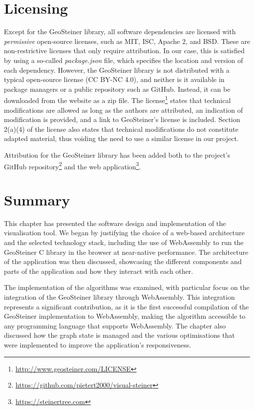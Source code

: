 \documentclass{l4proj}
\begin{document}
\section{Licensing}
Except for the GeoSteiner library, all software dependencies are licensed with \textit{permissive} open-source licenses, such as MIT, ISC, Apache 2, and BSD. These are non-restrictive licenses that only require attribution. In our case, this is satisfied by using a so-called \textit{package.json} file, which specifies the location and version of each dependency.
However, the GeoSteiner library is not distributed with a typical open-source license (CC BY-NC 4.0), and neither is it available in package managers or a public repository such as GitHub. Instead, it can be downloaded from the website as a zip file.
The license\footnote{\url{http://www.geosteiner.com/LICENSE}} states that technical modifications are allowed as long as the authors are attributed, an indication of modification is provided, and a link to GeoSteiner's license is included. Section 2(a)(4) of the license also states that technical modifications do not constitute adapted material, thus voiding the need to use a similar license in our project.

Attribution for the GeoSteiner library has been added both to the project's GitHub repository\footnote{\url{https://github.com/pietert2000/visual-steiner}} and the web application\footnote{\url{https://steinertree.com}}.

\section{Summary}
This chapter has presented the software design and implementation of the visualisation tool. We began by justifying the choice of a web-based architecture and the selected technology stack, including the use of WebAssembly to run the GeoSteiner C library in the browser at near-native performance. The architecture of the application was then discussed, showcasing the different components and parts of the application and how they interact with each other.

The implementation of the algorithms was examined, with particular focus on the integration of the GeoSteiner library through WebAssembly. This integration represents a significant contribution, as it is the first successful compilation of the GeoSteiner implementation to WebAssembly, making the algorithm accessible to any programming language that supports WebAssembly. The chapter also discussed how the graph state is managed and the various optimisations that were implemented to improve the application's responsiveness.
\end{document}
